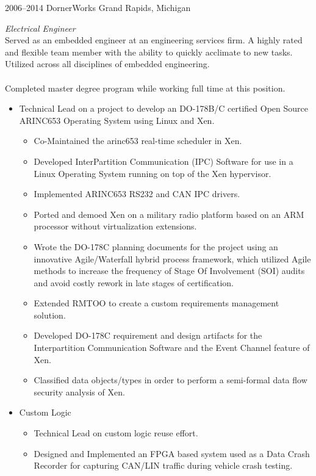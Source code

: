\documentclass[print]{template/friggeri-cv} %
\begin{document}
\begin{entrylist}

\entry
{2006--2014}
{DornerWorks}
{Grand Rapids, Michigan}
{\emph{Electrical Engineer} \\
Served as an embedded engineer at an engineering services firm.  A highly rated and flexible team member with the ability to quickly acclimate to new tasks.  Utilized across all disciplines of embedded engineering.  
\\
\\
Completed master degree program while working full time at this position.
\begin{itemize}
\item Technical Lead on a project to develop an DO-178B/C certified Open Source ARINC653 Operating System using Linux and Xen.
\begin{itemize}
\item Co-Maintained the arinc653 real-time scheduler in Xen.
\item Developed InterPartition Communication (IPC) Software for use in a Linux Operating System running on top of the Xen hypervisor.
\item Implemented ARINC653 RS232 and CAN IPC drivers.
\item Ported and demoed Xen on a military radio platform based on an ARM processor without virtualization extensions.
\item Wrote the DO-178C planning documents for the project using an innovative Agile/Waterfall hybrid process framework, which utilized Agile methods to increase the frequency of Stage Of Involvement (SOI) audits and avoid costly rework in late stages of certification.
\item Extended RMTOO to create a custom requirements management solution.
\item Developed DO-178C requirement and design artifacts for the Interpartition Communication Software and the Event Channel feature of Xen.
\item Classified data objects/types in order to perform a semi-formal data flow security analysis of Xen.
\end{itemize}
\item Custom Logic
\begin{itemize}
\item Technical Lead on custom logic reuse effort.
\item Designed and Implemented an FPGA based system used as a Data Crash Recorder for capturing CAN/LIN traffic during vehicle crash testing.

\end{itemize}
\end{itemize}}
\end{entrylist}
\end{document}
